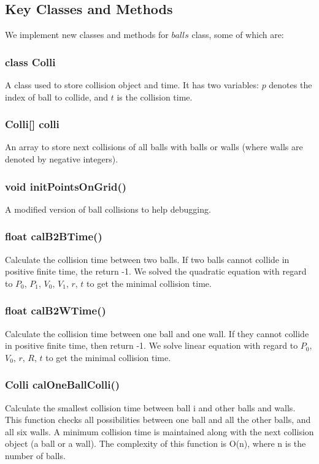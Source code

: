 \documentclass[twoside,11pt]{article}
\begin{document}
\subsection{Key Classes and Methods}
We implement new classes and methods for $balls$ class, some of which are:

\subsubsection{class Colli}
A class used to store collision object and time. It has two variables: $p$ denotes the index of ball to collide, and $t$ is the collision time.

\subsubsection{Colli[] colli}
An array to store next collisions of all balls with balls or walls (where walls are denoted by negative integers).

\subsubsection{void initPointsOnGrid()}
A modified version of ball collisions to help debugging.

\subsubsection{float calB2BTime()}
Calculate the collision time between two balls. If two balls cannot collide in positive finite time, the return -1. We solved the quadratic equation with regard to $P_0$, $P_1$, $V_0$, $V_1$, $r$, $t$ to get the minimal collision time.

\subsubsection{float calB2WTime()}
Calculate the collision time between one ball and one wall. If they cannot collide in positive finite time, then return -1. We solve linear equation with regard to $P_0$, $V_0$, $r$, $R$, $t$ to get the minimal collision time.

\subsubsection{Colli calOneBallColli()}
Calculate the smallest collision time between ball i and other balls and walls. This function checks all possibilities between one ball and all the other balls, and all six walls. A minimum collision time is maintained along with the next collision object (a ball or a wall). The complexity of this function is O(n), where n is the number of balls.
\end{document}
